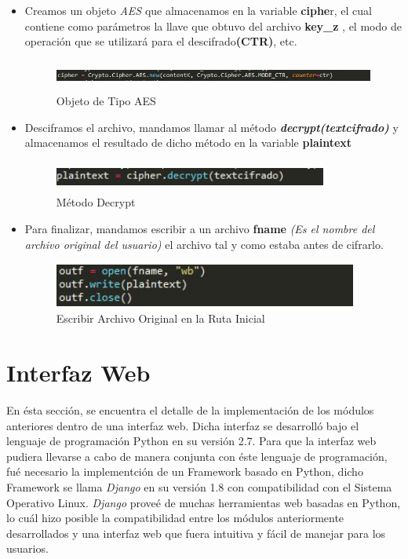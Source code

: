 \begin{itemize}
		\item Creamos un objeto \textit{AES} que almacenamos en la variable \textbf{ciphe}r, el cual contiene como parámetros la llave que obtuvo del archivo \textbf{key\_z }, el modo de operación que se utilizará para el descifrado\textbf{(CTR)}, etc.
			\begin{figure}[H]
			\centering
			\includegraphics[width=15cm, height=1cm]{./images/cifrado/03.jpg}
			\caption{Objeto de Tipo AES}
			\label{fig:6-3-4} 
			\end{figure} 


		\item Desciframos el archivo, mandamos llamar al método \textbf{\textit{decrypt(textcifrado)}}  y almacenamos el resultado de dicho método en la variable \textbf{plaintext}
			\begin{figure}[H]
			\centering
			\includegraphics[width=9cm, height=1cm]{./images/descifrado/05.jpg}
			\caption{Método Decrypt}
			\label{fig:6-3-5} 
			\end{figure} 

		\item Para finalizar, mandamos escribir a un archivo \textbf{fname} \textit{(Es el nombre del archivo original del usuario)} el archivo tal y como estaba antes de cifrarlo. 
			\begin{figure}[H]
			\centering
			\includegraphics[width=10cm, height=1.5cm]{./images/descifrado/06.jpg}
			\caption{Escribir Archivo Original en la Ruta Inicial}
			\label{fig:6-3-6} 
			\end{figure} 

\end{itemize}

\section{Interfaz Web}
En ésta sección, se encuentra el detalle de la implementación de los módulos anteriores dentro de una interfaz web. Dicha interfaz se desarrolló bajo el lenguaje de programación Python en su versión 2.7. Para que la interfaz web pudiera llevarse a cabo de manera conjunta con éste lenguaje de programación,  fué necesario la implementción de un Framework basado en Python, dicho Framework se llama \textit{Django} en su versión 1.8 con compatibilidad con el Sistema Operativo Linux. \textit{Django} proveé de muchas herramientas web basadas en Python, lo cuál hizo posible la compatibilidad entre los módulos anteriormente desarrollados y una interfaz web que fuera intuitiva y fácil de manejar para los usuarios.  \\ 

